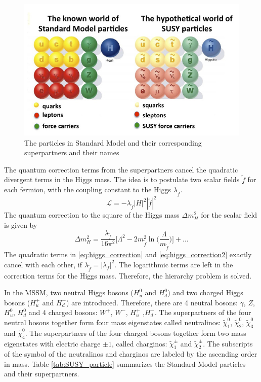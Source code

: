 \begin{figure}
\centering
\includegraphics[width=\textwidth]{data/photo/theory/SM-SUSY-diagram.jpg}
\caption{The particles in Standard Model and their corresponding superpartners and their names}
\label{fig:SUSY_particles}
\end{figure}

The quantum correction terms from the superpartners cancel the quadratic divergent terms in the Higgs mass.
The idea is to postulate two scalar fields $\tilde{f}$ for each fermion, with the coupling constant to the Higgs $\lambda_{\tilde{f}}$.
\begin{equation}
\mathcal{L} = - \lambda_{\tilde{f}} |H|^2 |\tilde{f}|^2
\end{equation}
The quantum correction to the square of the Higgs mass $\Delta m^2_H$ for the scalar field is given by \cite{primer}
\begin{equation}
\Delta m^2_H = \frac{ \lambda_{\tilde{f}} }{16 \pi^2} \Big[ \Lambda^2 - 2 m_{\tilde{f}}^2 \ln \Big( \frac{\Lambda}{m_{\tilde{f}}} \Big) \Big] + \dots
\label{eq:higgs_correction2}
\end{equation}
The quadratic terms in \ref{eq:higgs_correction} and \ref{eq:higgs_correction2} exactly cancel with each other, if $\lambda_{\tilde{f}} = |\lambda_f|^2$.
The logarithmic terms are left in the correction terms for the Higgs mass.
Therefore, the hierarchy problem is solved.

In the MSSM, two neutral Higgs bosons ($H^0_u$ and $H^0_d$) and two charged Higgs bosons ($H^+_u$ and $H^-_d$) are introduced.
Therefore, there are 4 neutral bosons: $\gamma$, $Z$, $H^0_u$, $H^0_d$ and 4 charged bosons: $W^+$, $W^-$, $H^+_u$ ,$H^-_d$.
The superpartners of the four neutral bosons together form four mass eigenstates called neutralinos: $\tilde{\chi}_1^0$, $\tilde{\chi}_2^0$, $\tilde{\chi}_3^0$ and $\tilde{\chi}_4^0$.
The superpartners of the four charged bosons together form two mass eigenstates with electric charge $\pm 1$, called charginos: $\tilde{\chi}_1^\pm$ and $\tilde{\chi}_2^\pm$.
The subscripts of the symbol of the neutralinos and charginos are labeled by the ascending order in mass.
Table \ref{tab:SUSY_particle} summarizes the Standard Model particles and their superpartners.

